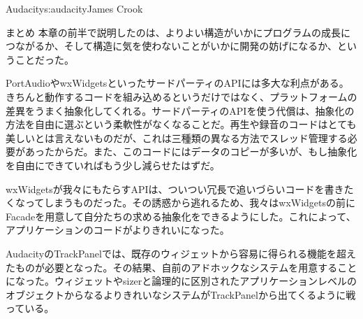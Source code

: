 \begin{aosachapter}{Audacity}{s:audacity}{James Crook}
\begin{aosasect1}{まとめ}
本章の前半で説明したのは、よりよい構造がいかにプログラムの成長につながるか、そして構造に気を使わないことがいかに開発の妨げになるか、ということだった。

\begin{aosaitemize}

\item PortAudioやwxWidgetsといったサードパーティのAPIには多大な利点がある。きちんと動作するコードを組み込めるというだけではなく、プラットフォームの差異をうまく抽象化してくれる。サードパーティのAPIを使う代償は、抽象化の方法を自由に選ぶという柔軟性がなくなることだ。再生や録音のコードはとても美しいとは言えないものだが、これは三種類の異なる方法でスレッド管理する必要があったからだ。また、このコードにはデータのコピーが多いが、もし抽象化を自由にできていればもう少し減らせたはずだ。

\item wxWidgetsが我々にもたらすAPIは、ついつい冗長で追いづらいコードを書きたくなってしまうものだった。その誘惑から逃れるため、我々はwxWidgetsの前にFacadeを用意して自分たちの求める抽象化をできるようにした。これによって、アプリケーションのコードがよりきれいになった。

\item AudacityのTrackPanelでは、既存のウィジェットから容易に得られる機能を超えたものが必要となった。その結果、自前のアドホックなシステムを用意することになった。ウィジェットやsizerと論理的に区別されたアプリケーションレベルのオブジェクトからなるよりきれいなシステムがTrackPanelから出てくるように戦っている。


\end{aosaitemize}
\end{aosasect1}
\end{aosachapter}
